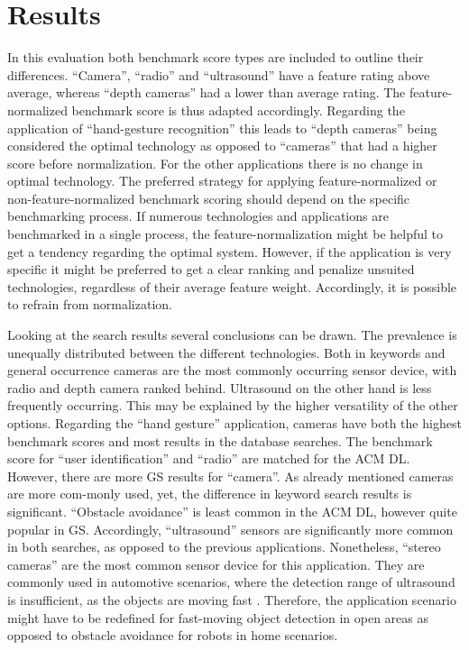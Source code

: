 \section{Results}
In this evaluation both benchmark score types are included to outline their differences. “Camera”, “radio” and “ultrasound” have a feature rating above average, whereas “depth cameras” had a lower than average rating. The feature-normalized benchmark score is thus adapted accordingly. Regarding the application of “hand-gesture recognition” this leads to “depth cameras” being considered the optimal technology as opposed to “cameras” that had a higher score before normalization. For the other applications there is no change in optimal technology. The preferred strategy for applying feature-normalized or non-feature-normalized benchmark scoring should depend on the specific benchmarking process. If numerous technologies and applications are benchmarked in a single process, the feature-normalization might be helpful to get a tendency regarding the optimal system. However, if the application is very specific it might be preferred to get a clear ranking and penalize unsuited technologies, regardless of their average feature weight. Accordingly, it is possible to refrain from normalization.

Looking at the search results several conclusions can be drawn. The prevalence is unequally distributed between the different technologies. Both in keywords and general occurrence cameras are the most commonly occurring sensor device, with radio and depth camera ranked behind. Ultrasound on the other hand is less frequently occurring. This may be explained by the higher versatility of the other options. Regarding the “hand gesture” application, cameras have both the highest benchmark scores and most results in the database searches. The benchmark score for “user identification” and “radio” are matched for the ACM DL. However, there are more GS results for “camera”. As already mentioned cameras are more com-monly used, yet, the difference in keyword search results is significant. “Obstacle avoidance” is least common in the ACM DL, however quite popular in GS. Accordingly, “ultrasound” sensors are significantly more common in both searches, as opposed to the previous applications. Nonetheless, “stereo cameras” are the most common sensor device for this application. They are commonly used in automotive scenarios, where the detection range of ultrasound is insufficient, as the objects are moving fast \cite{bertozzi1998gold}. Therefore, the application scenario might have to be redefined for fast-moving object detection in open areas as opposed to obstacle avoidance for robots in home scenarios. 

